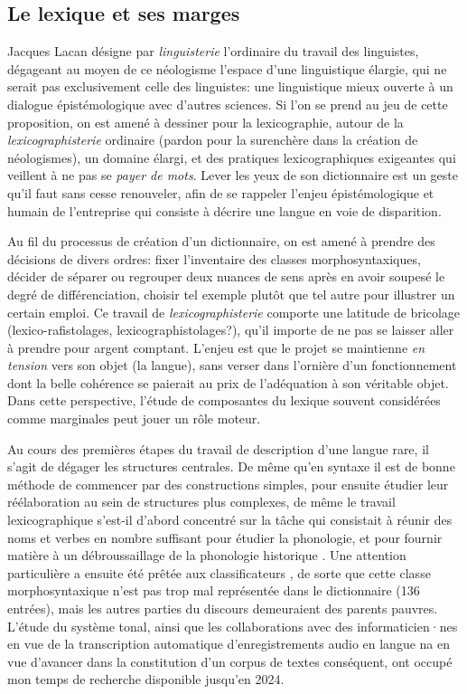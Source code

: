 \subsection{Le lexique et ses marges}
\label{sec:marges}
Jacques Lacan désigne par \emph{linguisterie} l'ordinaire du travail des linguistes, dégageant au moyen de ce néologisme l'espace d'une linguistique élargie, qui ne serait pas exclusivement celle des linguistes: une linguistique mieux ouverte à un dialogue épistémologique avec d'autres sciences. Si l'on se prend au jeu de cette proposition, on est amené à dessiner pour la lexicographie, autour de la \emph{lexicographisterie} ordinaire (pardon pour la surenchère dans la création de néologismes), un domaine élargi, et des pratiques lexicographiques exigeantes qui veillent à ne pas se \emph{payer de mots}. Lever les yeux de son dictionnaire est un geste qu'il faut sans cesse renouveler, afin de se rappeler l’enjeu épistémologique et humain de l’entreprise qui consiste à décrire une langue en voie de disparition.

Au fil du processus de création d'un dictionnaire, on est amené à prendre des décisions de divers ordres: fixer l'inventaire des classes morphosyntaxiques, décider de séparer ou regrouper deux nuances de sens après en avoir soupesé le degré de différenciation, choisir tel exemple plutôt que tel autre pour illustrer un certain emploi. Ce travail de \emph{lexicographisterie} comporte une latitude de bricolage (lexico-rafistolages, lexicographistolages?), qu'il importe de ne pas se laisser aller à prendre pour argent comptant. L'enjeu est que le projet se maintienne \emph{en tension} vers son objet (la langue), sans verser dans l'ornière d'un fonctionnement dont la belle cohérence se paierait au prix de l'adéquation à son véritable objet. Dans cette perspective, l'étude de composantes du lexique souvent considérées comme marginales peut jouer un rôle moteur.

Au cours des premières étapes du travail de description d'une langue rare, il s'agit de dégager les structures centrales. De même qu'en syntaxe il est de bonne méthode de commencer par des constructions simples, pour ensuite étudier leur réélaboration au sein de structures plus complexes, de même le travail lexicographique s'est-il d'abord concentré sur la tâche qui consistait à réunir des noms et verbes en nombre suffisant pour étudier la phonologie, et pour fournir matière à un débroussaillage de la phonologie historique \parencite{jacquesetal2011}. Une attention particulière a ensuite été prêtée aux classificateurs \parencite{michaud2011c,michaud2013d}, de sorte que cette classe morphosyntaxique n'est pas trop mal représentée dans le dictionnaire (136 entrées), mais les autres parties du discours demeuraient des parents pauvres. L'étude du système tonal, ainsi que les collaborations avec des informaticien·nes en vue de la transcription automatique d'enregistrements audio en langue na \parencite{michaudetal2018integrating,guillaume_plugging_2022} en vue d'avancer dans la constitution d'un corpus de textes conséquent, ont occupé mon temps de recherche disponible jusqu'en 2024.

